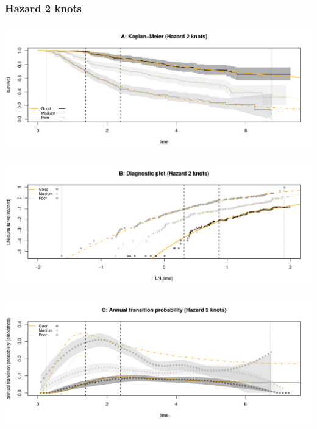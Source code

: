 \documentclass[
]{article}
\begin{document}
\clearpage

\subsubsection{Hazard 2 knots}\label{hazard-2-knots}

\begin{flushleft}\includegraphics[height=0.25\textheight]{BC_OS_output/Images/Figure_spline_models-4} \end{flushleft}

\begin{flushleft}\includegraphics[height=0.25\textheight]{BC_OS_output/Images/Figure_spline_models-5} \end{flushleft}

\begin{flushleft}\includegraphics[height=0.25\textheight]{BC_OS_output/Images/Figure_spline_models-6} \end{flushleft}
\end{document}
